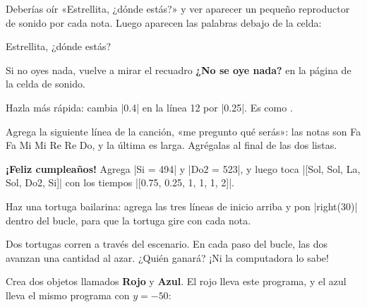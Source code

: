 Deberías oír «Estrellita, ¿dónde estás?» y ver aparecer un pequeño reproductor de sonido por cada nota. Luego aparecen las palabras debajo de la celda:

\begin{outputbox}
Estrellita, ¿dónde estás?
\end{outputbox}

Si no oyes nada, vuelve a mirar el recuadro \textbf{¿No se oye nada?} en la página de la celda de sonido.

\begin{challenge}
\tick Hazla más rápida: cambia \py|0.4| en la línea 12 por \py|0.25|. Es como .\par
\tick Agrega la siguiente línea de la canción, «me pregunto qué serás»: las notas son Fa Fa Mi Mi Re Re Do, y la última es larga. Agrégalas al final de las dos listas.\par
\tick \textbf{¡Feliz cumpleaños!} Agrega \py|Si = 494| y \py|Do2 = 523|, y luego toca \py|[Sol, Sol, La, Sol, Do2, Si]| con los tiempos \py|[0.75, 0.25, 1, 1, 1, 2]|.\par
\tick Haz una tortuga bailarina: agrega las tres líneas de inicio arriba y pon \py|right(30)| dentro del bucle, para que la tortuga gire con cada nota.
\end{challenge}


Dos tortugas corren a través del escenario. En cada paso del bucle, las dos avanzan una cantidad al azar. ¿Quién ganará? ¡Ni la computadora lo sabe!

Crea dos objetos llamados \textbf{Rojo} y \textbf{Azul}. El rojo lleva este programa, y el azul lleva el mismo programa con $y = -50$:

\begin{center}
\begin{scratch}
\end{scratch}
\end{center}

